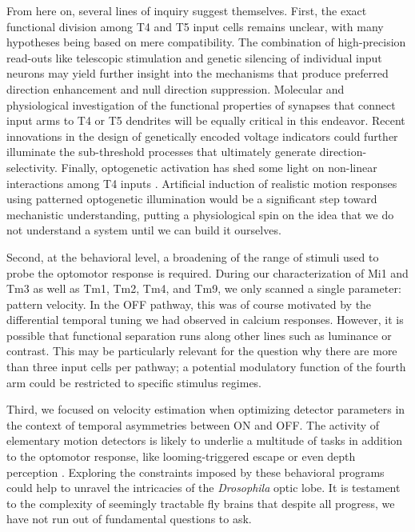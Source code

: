 From here on, several lines of inquiry suggest themselves. First, the exact functional division among T4 and T5 input cells remains unclear, with many hypotheses being based on mere compatibility. The combination of high-precision read-outs like telescopic stimulation and genetic silencing of individual input neurons may yield further insight into the mechanisms that produce preferred direction enhancement and null direction suppression. Molecular and physiological investigation of the functional properties of synapses that connect input arms to T4 or T5 dendrites will be equally critical in this endeavor. Recent innovations in the design of genetically encoded voltage indicators could further illuminate the sub-threshold processes that ultimately generate direction-selectivity. Finally, optogenetic activation has shed some light on non-linear interactions among T4 inputs \citep{Strother:2017aa}. Artificial induction of realistic motion responses using patterned optogenetic illumination would be a significant step toward mechanistic understanding, putting a physiological spin on the idea that we do not understand a system until we can build it ourselves.

Second, at the behavioral level, a broadening of the range of stimuli used to probe the optomotor response is required. During our characterization of Mi1 and Tm3 as well as Tm1, Tm2, Tm4, and Tm9, we only scanned a single parameter: pattern velocity. In the OFF pathway, this was of course motivated by the differential temporal tuning we had observed in calcium responses. However, it is possible that functional separation runs along other lines such as luminance or contrast. This may be particularly relevant for the question why there are more than three input cells per pathway; a potential modulatory function of the fourth arm could be restricted to specific stimulus regimes.

Third, we focused on velocity estimation when optimizing detector parameters in the context of temporal asymmetries between ON and OFF. The activity of elementary motion detectors is likely to underlie a multitude of tasks in addition to the optomotor response, like looming-triggered escape or even depth perception \citep{Schilling:2015jh,Schwegmann:2014ir}. Exploring the constraints imposed by these behavioral programs could help to unravel the intricacies of the \textit{Drosophila} optic lobe. It is testament to the complexity of seemingly tractable fly brains that despite all progress, we have not run out of fundamental questions to ask.
